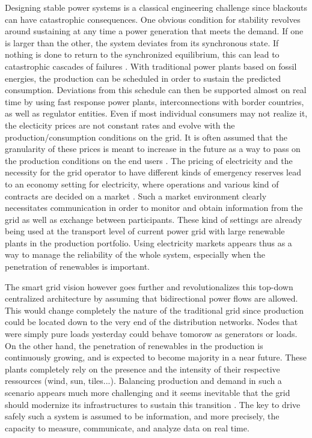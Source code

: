 \documentclass[conference]{IEEEtran}
\begin{document}
Designing stable power systems is a classical engineering challenge since blackouts can have catastrophic consequences. One obvious condition for stability revolves around sustaining at any time a power generation that meets the demand. If one is larger than the other, the system deviates from its synchronous state. If nothing is done to return to the synchronized equilibrium, this can lead to catastrophic cascades of failures \cite{Brummitt2012} \cite{Wang2009}. With traditional power plants based on fossil energies, the production can be scheduled in order to sustain the predicted consumption. Deviations from this schedule can then be supported almost on real time by using fast response power plants, interconnections with border countries, as well as regulator entities. Even if most individual consumers may not realize it, the electicity prices are not constant rates and evolve with the production/consumption conditions on the grid. It is often assumed that the granularity of these prices is meant to increase in the future as a way to pass on the production conditions on the end users \cite{Jiang2014}. The pricing of electricity and the necessity for the grid operator to have different kinds of emergency reserves lead to an economy setting for electricity, where operations and various kind of contracts are decided on a market \cite{Europe}. Such a market environment clearly necessitates communication in order to monitor and obtain information from the grid as well as exchange between participants. These kind of settings are already being used at the transport level of current power grid with large renewable plants in the production portfolio. Using electricity markets appears thus as a way to manage the reliability of the whole system, especially when the penetration of renewables is important.

The smart grid vision however goes further and revolutionalizes this top-down centralized architecture by assuming that bidirectional power flows are allowed. This would change completely the nature of the traditional grid since production could be located down to the very end of the distribution networks. Nodes that were simply pure loads yesterday could behave tomorow as generators or loads. On the other hand, the penetration of renewables in the production is continuously growing, and is expected to become majority in a near future. These plants completely rely on the presence and the intensity of their respective ressources (wind, sun, tiles...). Balancing production and demand in such a scenario appears much more challenging and it seems inevitable that the grid should modernize its infrastructures to sustain this transition \cite{Europe}. The key to drive safely such a system is assumed to be information, and more precisely, the capacity to measure, communicate, and analyze data on real time.
\end{document}
